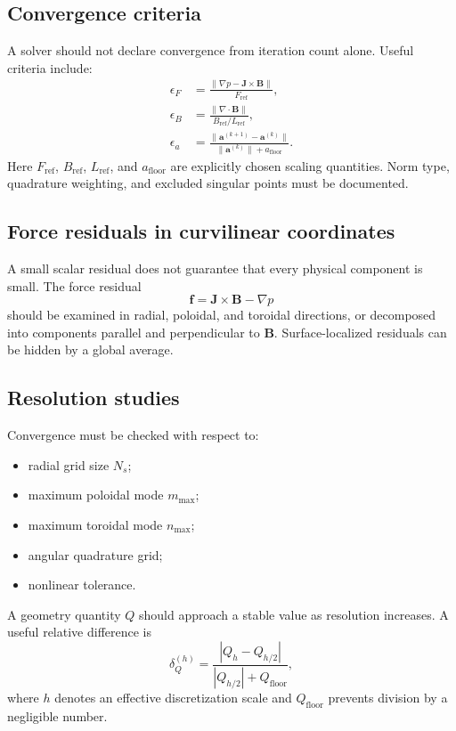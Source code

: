 \subsection{Convergence criteria}
A solver should not declare convergence from iteration count alone. Useful criteria include:
\begin{align}
\epsilon_F&=\frac{\|\nabla p-\mathbf J\times\mathbf B\|}{F_{\mathrm{ref}}},\\
\epsilon_B&=\frac{\|\nabla\cdot\mathbf B\|}{B_{\mathrm{ref}}/L_{\mathrm{ref}}},\\
\epsilon_a&=\frac{\|\mathbf a^{(k+1)}-\mathbf a^{(k)}\|}{\|\mathbf a^{(k)}\|+a_{\mathrm{floor}}}.
\end{align}
Here $F_{\mathrm{ref}}$, $B_{\mathrm{ref}}$, $L_{\mathrm{ref}}$, and $a_{\mathrm{floor}}$ are explicitly chosen scaling quantities. Norm type, quadrature weighting, and excluded singular points must be documented.

\subsection{Force residuals in curvilinear coordinates}
A small scalar residual does not guarantee that every physical component is small. The force residual
\begin{equation}
\mathbf f=\mathbf J\times\mathbf B-\nabla p
\end{equation}
should be examined in radial, poloidal, and toroidal directions, or decomposed into components parallel and perpendicular to $\mathbf B$. Surface-localized residuals can be hidden by a global average.

\subsection{Resolution studies}
Convergence must be checked with respect to:
\begin{itemize}[leftmargin=1.6em]
\item radial grid size $N_s$;
\item maximum poloidal mode $m_{\max}$;
\item maximum toroidal mode $n_{\max}$;
\item angular quadrature grid;
\item nonlinear tolerance.
\end{itemize}
A geometry quantity $Q$ should approach a stable value as resolution increases. A useful relative difference is
\begin{equation}
\delta_Q^{(h)}
=\frac{|Q_h-Q_{h/2}|}{|Q_{h/2}|+Q_{\mathrm{floor}}},
\end{equation}
where $h$ denotes an effective discretization scale and $Q_{\mathrm{floor}}$ prevents division by a negligible number.

